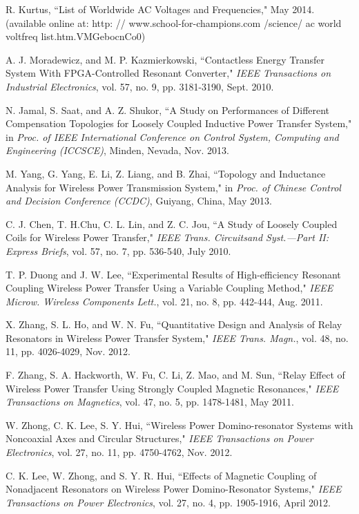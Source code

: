\documentclass[twocolumn,10pt]{IEEEtran}
\begin{document}
\begin{thebibliography}{99}
R. Kurtus, ``List of Worldwide AC Voltages and Frequencies," May 2014. (available online at: http: // www.school-for-champions.com /science/ ac world voltfreq list.htm.VMGebocnCo0) 

A. J. Moradewicz, and M. P. Kazmierkowski, ``Contactless Energy Transfer System With FPGA-Controlled Resonant Converter," \emph{IEEE Transactions on Industrial Electronics}, vol. 57, no. 9, pp. 3181-3190, Sept. 2010.


N. Jamal, S. Saat, and A. Z. Shukor, ``A Study on Performances of Different Compensation Topologies for Loosely Coupled Inductive Power Transfer System,"  in \emph{Proc. of IEEE International Conference on 
Control System, Computing and Engineering (ICCSCE)},  Minden, Nevada, Nov. 2013.

 M. Yang, G. Yang, E. Li, Z. Liang, and B. Zhai, ``Topology and Inductance Analysis for Wireless Power Transmission System," in \emph{Proc. of Chinese Control and Decision Conference (CCDC)}, Guiyang, China, May 2013.


C. J. Chen, T. H.Chu, C. L. Lin, and Z. C. Jou, ``A Study of Loosely Coupled Coils for Wireless Power Transfer," \emph{IEEE Trans. Circuitsand Syst.—Part II: Express Briefs}, vol. 57, no. 7, pp. 536-540, July 2010.

T. P. Duong and J. W. Lee, ``Experimental Results of High-efficiency Resonant Coupling Wireless Power Transfer Using a Variable Coupling Method," \emph{IEEE Microw. Wireless Components Lett.}, vol. 21, no. 8, pp. 442-444, Aug. 2011.

 X. Zhang, S. L. Ho, and W. N. Fu, ``Quantitative Design and Analysis of Relay Resonators in Wireless Power Transfer System," \emph{IEEE Trans. Magn.}, vol. 48, no. 11, pp. 4026-4029, Nov. 2012.


 F. Zhang, S. A. Hackworth, W. Fu, C. Li, Z. Mao, and M. Sun, ``Relay Effect of Wireless Power Transfer Using Strongly Coupled Magnetic Resonances," \emph{IEEE Transactions on Magnetics}, vol. 47, no. 5, pp. 1478-1481, May 2011.

   W. Zhong, C. K. Lee, S. Y. Hui, ``Wireless Power Domino-resonator Systems with Noncoaxial Axes and Circular Structures," \emph{IEEE Transactions on Power Electronics}, vol. 27, no. 11, pp. 4750-4762, Nov. 2012.
 
   C. K. Lee, W. Zhong, and S. Y. R. Hui, ``Effects of Magnetic Coupling of Nonadjacent Resonators on Wireless Power Domino-Resonator Systems," \emph{IEEE Transactions on Power Electronics}, vol. 27, no. 4, pp. 1905-1916, April 2012.
 

\end{thebibliography}
\end{document}
